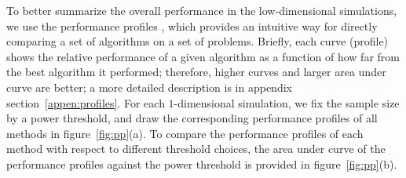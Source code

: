 \documentclass[11pt]{article}
\begin{document}
To better summarize the overall performance in the low-dimensional simulations, we use the performance profiles \cite{DolanMore2002}, which provides an intuitive way for directly comparing a set of algorithms on a set of problems.  Briefly, each curve (profile) shows the relative performance of a given algorithm as a function of how far from the best algorithm it performed; therefore, higher curves and larger area under curve are better; a more detailed description is in appendix section~\ref{appen:profiles}. For each $1$-dimensional simulation, we fix the sample size by a power threshold, and draw the corresponding performance profiles of all methods in figure~\ref{fig:pp}(a). To compare the performance profiles of each method with respect to different threshold choices, the area under curve of the performance profiles against the power threshold is provided in figure~\ref{fig:pp}(b).
\end{document}
